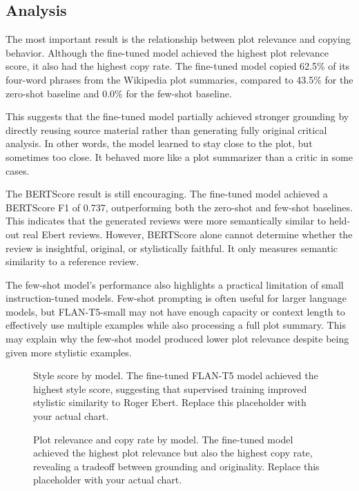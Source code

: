 \subsection{Analysis}

The most important result is the relationship between plot relevance and copying behavior. Although the fine-tuned model achieved the highest plot relevance score, it also had the highest copy rate. The fine-tuned model copied 62.5\% of its four-word phrases from the Wikipedia plot summaries, compared to 43.5\% for the zero-shot baseline and 0.0\% for the few-shot baseline.

This suggests that the fine-tuned model partially achieved stronger grounding by directly reusing source material rather than generating fully original critical analysis. In other words, the model learned to stay close to the plot, but sometimes too close. It behaved more like a plot summarizer than a critic in some cases.

The BERTScore result is still encouraging. The fine-tuned model achieved a BERTScore F1 of 0.737, outperforming both the zero-shot and few-shot baselines. This indicates that the generated reviews were more semantically similar to held-out real Ebert reviews. However, BERTScore alone cannot determine whether the review is insightful, original, or stylistically faithful. It only measures semantic similarity to a reference review.

The few-shot model's performance also highlights a practical limitation of small instruction-tuned models. Few-shot prompting is often useful for larger language models, but FLAN-T5-small may not have enough capacity or context length to effectively use multiple examples while also processing a full plot summary. This may explain why the few-shot model produced lower plot relevance despite being given more stylistic examples.

\begin{figure}[h]
\centering
\fbox{\rule{0pt}{1.5in}\rule{0.9\linewidth}{0pt}}
\caption{Style score by model. The fine-tuned FLAN-T5 model achieved the highest style score, suggesting that supervised training improved stylistic similarity to Roger Ebert. Replace this placeholder with your actual chart.}
\label{fig:style}
\end{figure}

\begin{figure}[h]
\centering
\fbox{\rule{0pt}{1.5in}\rule{0.9\linewidth}{0pt}}
\caption{Plot relevance and copy rate by model. The fine-tuned model achieved the highest plot relevance but also the highest copy rate, revealing a tradeoff between grounding and originality. Replace this placeholder with your actual chart.}
\label{fig:plotcopy}
\end{figure}
